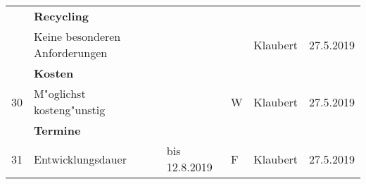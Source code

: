 \begin{center}
\begin{tabular}{|l|p{5cm}|p{3cm}|l|l|l|}
\hline
     & \textbf{Recycling} & & & & \\
   & Keine besonderen Anforderungen & & & Klaubert & 27.5.2019 \\
     \hline
     & \textbf{Kosten} & & & & \\
30 & M"oglichst kosteng"unstig & & W & Klaubert & 27.5.2019 \\
     \hline
     & \textbf{Termine} & & & & \\
 31 & Entwicklungsdauer & bis 12.8.2019 & F  & Klaubert & 27.5.2019 \\
     \hline
\end{tabular}
\end{center}
